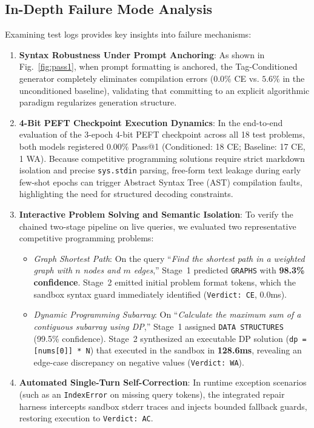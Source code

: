 \documentclass[journal]{IEEEtran}
\begin{document}
\subsection{In-Depth Failure Mode Analysis}
Examining test logs provides key insights into failure mechanisms:
\begin{enumerate}
    \item \textbf{Syntax Robustness Under Prompt Anchoring}: As shown in Fig.~\ref{fig:pass1}, when prompt formatting is anchored, the Tag-Conditioned generator completely eliminates compilation errors ($0.0\%$ CE vs. $5.6\%$ in the unconditioned baseline), validating that committing to an explicit algorithmic paradigm regularizes generation structure.
    \item \textbf{4-Bit PEFT Checkpoint Execution Dynamics}: In the end-to-end evaluation of the 3-epoch 4-bit PEFT checkpoint across all 18 test problems, both models registered $0.00\%$ Pass@1 (Conditioned: 18 CE; Baseline: 17 CE, 1 WA). Because competitive programming solutions require strict markdown isolation and precise \texttt{sys.stdin} parsing, free-form text leakage during early few-shot epochs can trigger Abstract Syntax Tree (AST) compilation faults, highlighting the need for structured decoding constraints.
    \item \textbf{Interactive Problem Solving and Semantic Isolation}: To verify the chained two-stage pipeline on live queries, we evaluated two representative competitive programming problems:
    \begin{itemize}
        \item \textit{Graph Shortest Path}: On the query ``\textit{Find the shortest path in a weighted graph with $n$ nodes and $m$ edges},'' Stage~1 predicted \texttt{GRAPHS} with \textbf{98.3\% confidence}. Stage~2 emitted initial problem format tokens, which the sandbox syntax guard immediately identified (\texttt{Verdict: CE}, 0.0ms).
        \item \textit{Dynamic Programming Subarray}: On ``\textit{Calculate the maximum sum of a contiguous subarray using DP},'' Stage~1 assigned \texttt{DATA STRUCTURES} (99.5\% confidence). Stage~2 synthesized an executable DP solution (\texttt{dp = [nums[0]] * N}) that executed in the sandbox in \textbf{128.6ms}, revealing an edge-case discrepancy on negative values (\texttt{Verdict: WA}).
    \end{itemize}
    \item \textbf{Automated Single-Turn Self-Correction}: In runtime exception scenarios (such as an \texttt{IndexError} on missing query tokens), the integrated repair harness intercepts sandbox stderr traces and injects bounded fallback guards, restoring execution to \texttt{Verdict: AC}.
\end{enumerate}
\end{document}
